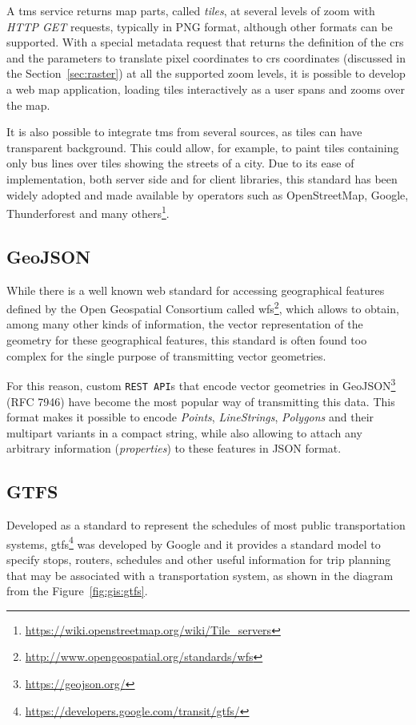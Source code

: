     A \gls{tms} service returns map parts, called \textit{tiles}, at several levels of zoom with {\em HTTP GET} requests, typically in PNG format, although other formats can be supported. With a special metadata request that returns the definition of the \gls{crs} and the parameters to translate pixel coordinates to \gls{crs} coordinates (discussed in the Section~\ref{sec:raster}) at all the supported zoom levels, it is possible to develop a web map application, loading tiles interactively as a user spans and zooms over the map.
    
    It is also possible to integrate \gls{tms} from several sources, as tiles can have transparent background. This could allow, for example, to paint tiles containing only bus lines over tiles showing the streets of a city. Due to its ease of implementation, both server side and for client libraries, this standard has been widely adopted and made available by operators such as OpenStreetMap, Google, Thunderforest and many others\footnote{\url{https://wiki.openstreetmap.org/wiki/Tile_servers}}.
    
    \subsection{GeoJSON}
    While there is a well known web standard for accessing geographical features defined by the Open Geospatial Consortium called \gls{wfs}\footnote{\url{http://www.opengeospatial.org/standards/wfs}}, which allows to obtain, among many other kinds of information, the vector representation of the geometry for these geographical features, this standard is often found too complex for the single purpose of transmitting vector geometries.
    
    For this reason, custom \texttt{REST API}s that encode vector geometries in GeoJSON\footnote{\url{https://geojson.org/}} (RFC 7946) have become the most popular way of transmitting this data. This format makes it possible to encode \textit{Points},  \textit{LineStrings}, \textit{Polygons} and their multipart variants in a compact string, while also allowing to attach any arbitrary information (\textit{properties}) to these features in JSON format.
    
    \subsection{GTFS}
    Developed as a standard to represent the schedules of most public transportation systems, \gls{gtfs}\footnote{\url{https://developers.google.com/transit/gtfs/}} was developed by Google and it provides a standard model to specify stops, routers, schedules and other useful information for trip planning that may be associated with a transportation system, as shown in the diagram from the Figure~\ref{fig:gis:gtfs}.
    

